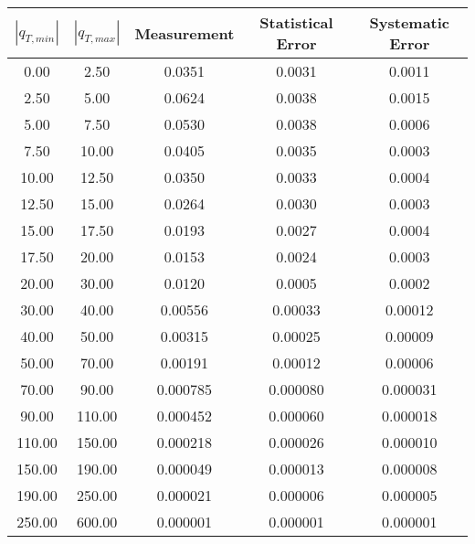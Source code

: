 \begin{tabular}{|c|c||c|c|c|}
\hline
$|q_{T,min}|$ & $|q_{T,max}|$ & Measurement & Statistical Error & Systematic Error \\ \hline
   0.00 &    2.50 &  0.0351 &  0.0031 &  0.0011 \\ 
   2.50 &    5.00 &  0.0624 &  0.0038 &  0.0015 \\ 
   5.00 &    7.50 &  0.0530 &  0.0038 &  0.0006 \\ 
   7.50 &   10.00 &  0.0405 &  0.0035 &  0.0003 \\ 
  10.00 &   12.50 &  0.0350 &  0.0033 &  0.0004 \\ 
  12.50 &   15.00 &  0.0264 &  0.0030 &  0.0003 \\ 
  15.00 &   17.50 &  0.0193 &  0.0027 &  0.0004 \\ 
  17.50 &   20.00 &  0.0153 &  0.0024 &  0.0003 \\ 
  20.00 &   30.00 &  0.0120 &  0.0005 &  0.0002 \\ 
  30.00 &   40.00 & 0.00556 & 0.00033 & 0.00012 \\ 
  40.00 &   50.00 & 0.00315 & 0.00025 & 0.00009 \\ 
  50.00 &   70.00 & 0.00191 & 0.00012 & 0.00006 \\ 
  70.00 &   90.00 & 0.000785 & 0.000080 & 0.000031 \\ 
  90.00 &  110.00 & 0.000452 & 0.000060 & 0.000018 \\ 
 110.00 &  150.00 & 0.000218 & 0.000026 & 0.000010 \\ 
 150.00 &  190.00 & 0.000049 & 0.000013 & 0.000008 \\ 
 190.00 &  250.00 & 0.000021 & 0.000006 & 0.000005 \\ 
 250.00 &  600.00 & 0.000001 & 0.000001 & 0.000001 \\ 
\hline
\end{tabular}